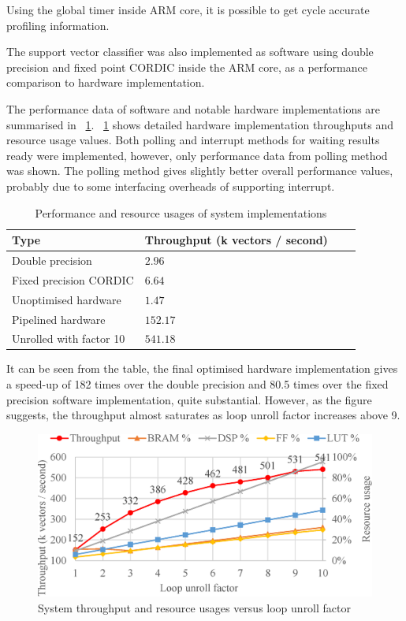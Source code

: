 \documentclass[journal]{IEEEtran}
\newcommand{\fref}[1]{\figurename~\ref{#1}}
\newcommand{\tref}[1]{\tablename~\ref{#1}}
\begin{document}
Using the global timer inside ARM core, it is possible to get cycle accurate profiling information.

The support vector classifier was also implemented as software using double precision and fixed point CORDIC inside the ARM core, as a performance comparison to hardware implementation.

The performance data of software and notable hardware implementations are summarised in \tref{tbl:throughput}. \fref{fig:throughput} shows detailed hardware implementation throughputs and resource usage values. Both polling and interrupt methods for waiting results ready were implemented, however, only performance data from polling method was shown. The polling method gives slightly better overall performance values, probably due to some interfacing overheads of supporting interrupt.

\begin{table}[ht]
	\renewcommand{\arraystretch}{1.3}
	\caption{Performance and resource usages of system implementations}
	\label{tbl:throughput}
	\centering
	\begin{tabular}{llll}
		\hline
		Type			& Throughput (k vectors / second)	\\
		\hline
		Double precision	& $2.96$	\\
		Fixed precision CORDIC	& $6.64$	\\
		\hline
		Unoptimised hardware	& $1.47$	\\
		Pipelined hardware	& $152.17$	\\
		Unrolled with factor 10	& $541.18$	\\
		\hline
	\end{tabular}
\end{table}

It can be seen from the table, the final optimised hardware implementation gives a speed-up of 182 times over the double precision and 80.5 times over the fixed precision software implementation, quite substantial. However, as the figure suggests, the throughput almost saturates as loop unroll factor increases above 9.

\begin{figure}[t]
	\centering
	\includegraphics[width=0.8\columnwidth]{throughput}
	\caption{System throughput and resource usages versus loop unroll factor}
	\label{fig:throughput}
\end{figure}
\end{document}
